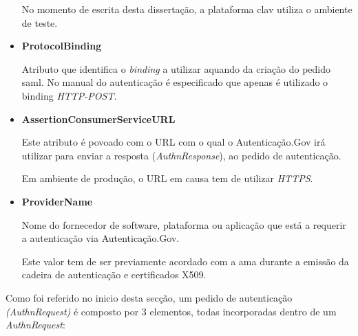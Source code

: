 \begin{itemize}
    No momento de escrita desta dissertação, a plataforma \gls{clav} utiliza o ambiente de teste.
    
    \item \textbf{ProtocolBinding}
    
    Atributo que identifica o \emph{binding} a utilizar aquando da criação do pedido \gls{saml}. No manual do autenticação\cite{manualAuthGov} é especificado que apenas é utilizado o binding \emph{HTTP-POST}.
    
    \item \textbf{AssertionConsumerServiceURL}
    
    Este atributo é povoado com o URL com o qual o Autenticação.Gov irá utilizar para enviar a resposta (\emph{AuthnResponse}), ao pedido de autenticação.
    
    Em ambiente de produção, o URL em causa tem de utilizar \emph{HTTPS}.
    
    \item \textbf{ProviderName}
    
    Nome do fornecedor de software, plataforma ou aplicação que está a requerir a autenticação via Autenticação.Gov.
    
    Este valor tem de ser previamente acordado com a \gls{ama} durante a emissão da cadeira de autenticação e certificados X509.
\end{itemize}

Como foi referido no inicio desta secção, um pedido de autenticação \emph{(AuthnRequest)} é composto por 3 elementos, todas incorporadas dentro de um \emph{AuthnRequest}:

